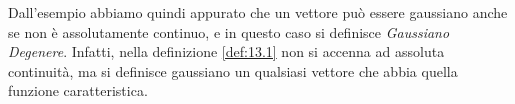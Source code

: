 Dall'esempio abbiamo quindi appurato che un vettore può essere gaussiano anche se non è assolutamente continuo, e in questo caso si definisce \textit{Gaussiano Degenere}. Infatti, nella definizione \ref{def:13.1} non si accenna ad assoluta continuità, ma si definisce gaussiano un qualsiasi vettore che abbia quella funzione caratteristica.